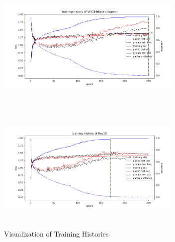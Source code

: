 \documentclass[journal, onecolumn]{IEEEtran}
\begin{document}
\begin{figure}[htb]
\begin{minipage}[t]{0.5\textwidth}
\includegraphics[width=3.5in, height=2.5in]{VGG19_cv1.png}
\end{minipage}%
\begin{minipage}[t]{0.5\textwidth}
\includegraphics[width=3.5in, height=2.5in]{Res18.png}
\end{minipage}%

\caption{Visualization of Training Histories}\label{fig:hists}
\end{figure}
\end{document}
